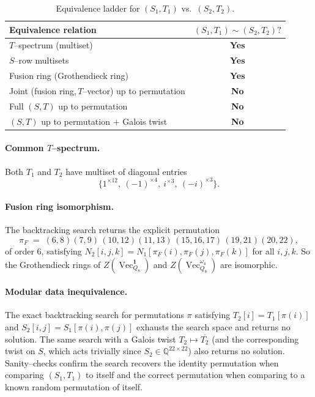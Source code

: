 \documentclass[11pt,a4paper]{amsart}
\theoremstyle{plain}
\theoremstyle{definition}
\DeclareMathOperator{\Vec}{Vec}
\newcommand{\Drinfeld}[2]{Z\!\left(\Vec_{#1}^{#2}\right)}
\newcommand{\trivcoc}{\mathbf{1}}
\begin{document}
\begin{table}[h!]
\centering
\renewcommand{\arraystretch}{1.15}
\begin{tabular}{lc}
\toprule
Equivalence relation & $(S_1,T_1) \sim (S_2,T_2)?$ \\
\midrule
$T$--spectrum (multiset) & \textbf{Yes} \\
$S$--row multisets & \textbf{Yes} \\
Fusion ring (Grothendieck ring) & \textbf{Yes} \\
Joint (fusion ring,\,$T$--vector) up to permutation & \textbf{No} \\
Full $(S,T)$ up to permutation & \textbf{No} \\
$(S,T)$ up to permutation $+$ Galois twist & \textbf{No} \\
\bottomrule
\end{tabular}
\caption{Equivalence ladder for $(S_1,T_1)$ vs.\ $(S_2,T_2)$.}
\end{table}

\paragraph*{Common $T$--spectrum.}
Both $T_1$ and $T_2$ have multiset of diagonal entries
\[
  \bigl\{1^{\times 12},\ (-1)^{\times 4},\ i^{\times 3},\ (-i)^{\times 3}\bigr\}.
\]

\paragraph*{Fusion ring isomorphism.}
The backtracking search returns the explicit permutation
\begin{equation}
\pi_F \;=\; (6,8)(7,9)\,(10,12)(11,13)\,(15,16,17)\,(19,21)(20,22),
\label{eq:piF}
\end{equation}
of order $6$, satisfying
$N_2[i,j,k] = N_1[\pi_F(i),\pi_F(j),\pi_F(k)]$ for all $i,j,k$. So
the Grothendieck rings of $\Drinfeld{Q_8}{\trivcoc}$ and
$\Drinfeld{Q_8}{\omega_4}$ are isomorphic.

\paragraph*{Modular data inequivalence.}
The exact backtracking search for permutations $\pi$ satisfying
$T_2[i] = T_1[\pi(i)]$ and $S_2[i,j]=S_1[\pi(i),\pi(j)]$ exhausts the
search space and returns no solution. The same search with a Galois
twist $T_2 \mapsto \overline{T_2}$ (and the corresponding twist on $S$,
which acts trivially since $S_2\in\mathbb Q^{22\times 22}$) also returns
no solution. Sanity--checks confirm the search recovers the identity
permutation when comparing $(S_1,T_1)$ to itself and the correct
permutation when comparing to a known random permutation of itself.
\end{document}

